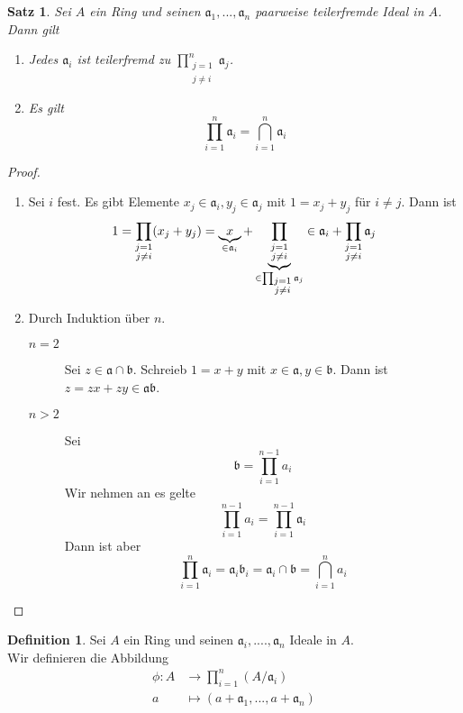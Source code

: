 \documentclass[10pt,a4paper]{article}
\theoremstyle{plain}
\newtheorem{satz}[theorem]{Satz}
\theoremstyle{definition}
\newtheorem{definition}[theorem]{Definition}
\theoremstyle{remark}
\begin{document}
	\begin{satz}
		Sei $A$ ein Ring und seinen $\mathfrak a_1,...,\mathfrak a_n$ paarweise teilerfremde Ideal in $A$. Dann gilt
		\begin{enumerate}
			\item Jedes $\mathfrak a_i$ ist teilerfremd zu $\prod_{\substack{j=1\\j\neq i}}^{n}\mathfrak a_j$.
			\item Es gilt
			\[\prod_{i=1}^{n}\mathfrak a_i=\bigcap_{i=1}^n \mathfrak a_i\]
		\end{enumerate}
	\end{satz}
	\begin{proof}
		\begin{enumerate}
			\item Sei $i$ fest. Es gibt Elemente $x_j\in \mathfrak a_i, y_j\in\mathfrak a_j$ mit $1=x_j+y_j$ für $i\neq j$. Dann ist
			\[
			1=\prod_{\substack{j=1\\j\neq i}}(x_j+y_j)
			=\underbrace{x}_{\mathclap{\in\mathfrak a_i}}+\underbrace{\prod_{\substack{j=1\\j\neq i}}}_{\in \prod_{\substack{j=1\\j\neq i}}\mathfrak a_j}
			\in\mathfrak a_i+\prod_{\substack{j=1\\j\neq i}}\mathfrak a_j
			\]
			\item Durch Induktion über $n$.
			\begin{description}
				\item[$n=2$] Sei $z\in\mathfrak a\cap\mathfrak b$. Schreieb $1=x+y$ mit $x\in\mathfrak a,y\in\mathfrak b$. Dann ist $z=zx+zy\in\mathfrak a\mathfrak b$.
				\item[$n>2$] Sei 
				\[\mathfrak b=\prod_{i=1}^{n-1}a_i\]
				Wir nehmen an es gelte
				\[\prod_{i=1}^{n-1}a_i=\prod_{i=1}^{n-1}\mathfrak a_i\]
				Dann ist aber
				\[\prod_{i=1}^n \mathfrak a_i=\mathfrak a_i\mathfrak b_i=\mathfrak a_i\cap\mathfrak b=\bigcap_{i=1}^n a_i\]
			\end{description}
		\end{enumerate}
	\end{proof}

	\begin{definition}
		Sei $A$ ein Ring und seinen $\mathfrak a_i,....,\mathfrak a_n$ Ideale in $A$.\\
		Wir definieren die Abbildung 
		\begin{align*}
		\phi:A&\to\prod_{i=1}^n(A/\mathfrak a_i)\\
		a&\mapsto(a+\mathfrak a_1,...,a+\mathfrak a_n)
		\end{align*}
	\end{definition}
\end{document}
